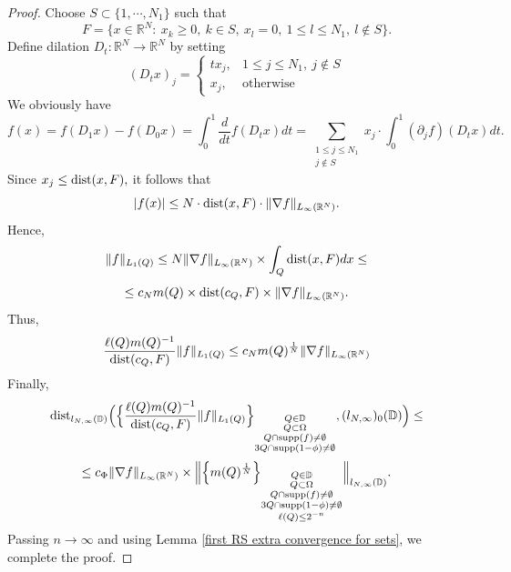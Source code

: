 \documentclass{amsart}
\begin{document}
\begin{proof}
Choose $S\subset\{1,\cdots,N_1\}$ such that
$$F=\{x\in\mathbb{R}^N:\ x_k\geq0,\ k\in S,\ x_l=0,\ 1\leq l\leq N_1,\ l\notin S\}.$$
Define dilation $D_t:\mathbb{R}^N\to\mathbb{R}^N$ by setting
$$(D_tx)_j=
\begin{cases}
tx_j,& 1\leq j\leq N_1,\ j\notin S\\
x_j,&\mbox{otherwise}
\end{cases}
$$
We obviously have
$$f(x)=f(D_1x)-f(D_0x)=\int_0^1\frac{d}{dt}f(D_tx)dt=\sum_{\substack{1\leq j\leq N_1\\ j\notin S}}x_j\cdot \int_0^1(\partial_j f)(D_tx)dt.$$
Since $x_j\leq{\rm dist}(x,F),$ it follows that
$$|f(x)|\leq N\cdot {\rm dist}(x,F)\cdot\|\nabla f\|_{L_{\infty}(\mathbb{R}^N)}.$$
Hence,
$$\|f\|_{L_1(Q)}\leq N\|\nabla f\|_{L_{\infty}(\mathbb{R}^N)}\times\int_Q{\rm dist}(x,F)dx\leq$$
$$\leq c_Nm(Q)\times {\rm dist}(c_Q,F)\times \|\nabla f\|_{L_{\infty}(\mathbb{R}^N)}.$$
Thus,
$$\frac{\ell(Q)m(Q)^{-1}}{{\rm dist}(c_Q,F)}\|f\|_{L_1(Q)}\leq c_Nm(Q)^{\frac1N}\|\nabla f\|_{L_{\infty}(\mathbb{R}^N)}$$
Finally,
$${\rm dist}_{l_{N,\infty}(\mathbb{D})}\Big(\Big\{\frac{\ell(Q)m(Q)^{-1}}{{\rm dist}(c_Q,F)}\|f\|_{L_1(Q)}\Big\}_{\substack{Q\in\mathbb{D}\\ Q\subset\Omega\\ Q\cap {\rm supp}(f)\neq\emptyset\\ 3Q\cap {\rm supp}(1-\phi)\neq\emptyset}},(l_{N,\infty})_0(\mathbb{D})\Big)\leq$$
$$\leq c_{\Phi}\|\nabla f\|_{L_{\infty}(\mathbb{R}^N)}\times\Big\|\Big\{m(Q)^{\frac1N}\Big\}_{\substack{Q\in\mathbb{D}\\ Q\subset\Omega\\ Q\cap {\rm supp}(f)\neq\emptyset\\ 3Q\cap {\rm supp}(1-\phi)\neq\emptyset\\ \ell(Q)\leq 2^{-n}}}\Big\|_{l_{N,\infty}(\mathbb{D})}.$$
Passing $n\to\infty$ and using Lemma \ref{first RS extra convergence for sets}, we complete the proof.
\end{proof}
\end{document}
